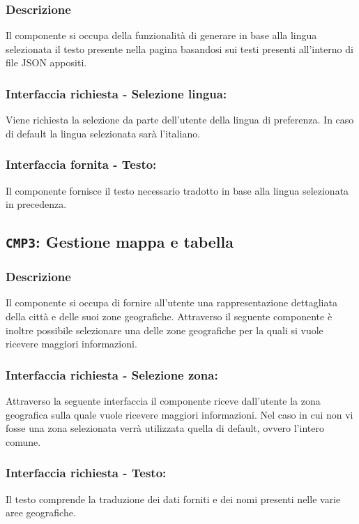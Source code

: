         \subsubsection{Descrizione} 
            Il componente si occupa della funzionalità di generare in base alla lingua selezionata il testo presente nella pagina basandosi sui testi presenti all'interno di file JSON appositi.
        \subsubsection{Interfaccia richiesta - Selezione lingua:}
            Viene richiesta la selezione da parte dell'utente della lingua di preferenza.
            In caso di default la lingua selezionata sarà l'italiano.
        \subsubsection{Interfaccia fornita - Testo:}
            Il componente fornisce il testo necessario tradotto in base alla lingua selezionata in precedenza.

    \subsection{\texttt{CMP3}: Gestione mappa e tabella}
        \subsubsection{Descrizione}
            Il componente si occupa di fornire all'utente una rappresentazione dettagliata della città e delle suoi zone geografiche. Attraverso il seguente componente è inoltre possibile selezionare una delle zone geografiche per la quali si vuole ricevere maggiori informazioni. 
        \subsubsection{Interfaccia richiesta - Selezione zona:}
            Attraverso la seguente interfaccia il componente riceve dall'utente la zona geografica sulla quale vuole ricevere maggiori informazioni. Nel caso in cui non vi fosse una zona selezionata verrà utilizzata quella di default, ovvero l'intero comune.
        \subsubsection{Interfaccia richiesta - Testo:}
            Il testo comprende la traduzione dei dati forniti e dei nomi presenti nelle varie aree geografiche.
